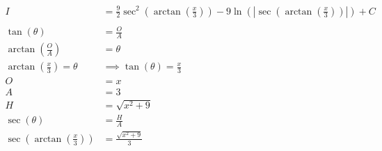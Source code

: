 \documentclass[12pt]{article}
\begin{document}
\begin{align}
    \nonumber                                                                                                                                                                                               \\
    I                                                & = \frac{9}{2}\sec^2\left(\arctan\left(\frac{x}{3}\right)\right) - 9\ln\left(\left|\sec\left(\arctan\left(\frac{x}{3}\right)\right)\right|\right) + C \\
    \nonumber                                                                                                                                                                                               \\
    \tan(\theta)                                     & = \frac{O}{A}                                                                                                                                        \\
    \arctan\left(\frac{O}{A}\right)                  & = \theta                                                                                                                                             \\
    \arctan\left(\frac{x}{3}\right) = \theta         & \implies \tan(\theta) = \frac{x}{3}                                                                                                                  \\
    O                                                & = x                                                                                                                                                  \\
    A                                                & = 3                                                                                                                                                  \\
    H                                                & = \sqrt{x^2+9}                                                                                                                                       \\
    \sec(\theta)                                     & = \frac{H}{A}                                                                                                                                        \\
    \sec\left(\arctan\left(\frac{x}{3}\right)\right) & = \frac{\sqrt{x^2+9}}{3}                                                                                                                             \\

\end{align}
\end{document}
